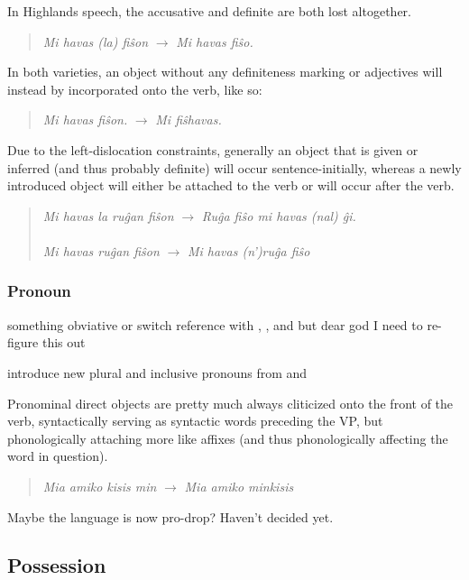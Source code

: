 In Highlands speech, the accusative and definite are both lost altogether.
\begin{quote}
    \textit{Mi havas (la) fiŝon} $\to$ \textit{Mi havas fiŝo.}
\end{quote}

In both varieties, an object without any definiteness marking or adjectives will instead by incorporated onto the verb, like so:
\begin{quote}
    \textit{Mi havas fiŝon.} $\to$ \textit{Mi fiŝhavas.}
\end{quote}
Due to the left-dislocation constraints, generally an object that is given or inferred (and thus probably definite) will occur sentence-initially, whereas a newly introduced object will either be attached to the verb or will occur after the verb.
\begin{quote}
    \textit{Mi havas la ruĝan fiŝon} $\to$
    \textit{Ruĝa fiŝo mi havas (nal) ĝi.}\\
    \\
    \textit{Mi havas ruĝan fiŝon} $\to$
    \textit{Mi havas (n')ruĝa fiŝo}\\
\end{quote}

\subsubsection{Pronoun}

something obviative or switch reference with , , and  but dear god I need to re-figure this out

introduce new plural and inclusive pronouns from  and 

Pronominal direct objects are pretty much always cliticized onto the front of the verb, syntactically serving as syntactic words preceding the VP, but phonologically attaching more like affixes (and thus phonologically affecting the word in question).
\begin{quote}
    \textit{Mia amiko kisis min} $\to$ \textit{Mia amiko minkisis}
\end{quote}

Maybe the language is now pro-drop? Haven't decided yet.

\subsection{Possession}

